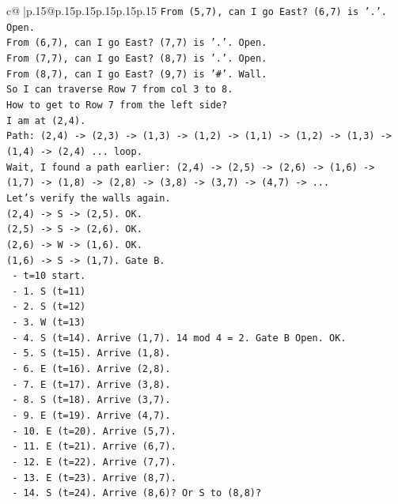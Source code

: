 \documentclass{article}
\begin{document}
{\begin{supertabular}{c@{$\;$}|p{.15\linewidth}@{}p{.15\linewidth}p{.15\linewidth}p{.15\linewidth}p{.15\linewidth}p{.15\linewidth}}
{{{\texttt{From (5,7), can I go East? (6,7) is '.'. Open.} \\
\texttt{From (6,7), can I go East? (7,7) is '.'. Open.} \\
\texttt{From (7,7), can I go East? (8,7) is '.'. Open.} \\
\texttt{From (8,7), can I go East? (9,7) is '\#'. Wall.} \\
\texttt{So I can traverse Row 7 from col 3 to 8.} \\
\texttt{How to get to Row 7 from the left side?} \\
\texttt{I am at (2,4).} \\
\texttt{Path: (2,4) {-}> (2,3) {-}> (1,3) {-}> (1,2) {-}> (1,1) {-}> (1,2) {-}> (1,3) {-}> (1,4) {-}> (2,4) ... loop.} \\
\texttt{Wait, I found a path earlier: (2,4) {-}> (2,5) {-}> (2,6) {-}> (1,6) {-}> (1,7) {-}> (1,8) {-}> (2,8) {-}> (3,8) {-}> (3,7) {-}> (4,7) {-}> ...} \\
\texttt{Let's verify the walls again.} \\
\texttt{(2,4) {-}> S {-}> (2,5). OK.} \\
\texttt{(2,5) {-}> S {-}> (2,6). OK.} \\
\texttt{(2,6) {-}> W {-}> (1,6). OK.} \\
\texttt{(1,6) {-}> S {-}> (1,7). Gate B.} \\
\texttt{   {-} t=10 start.} \\
\texttt{   {-} 1. S (t=11)} \\
\texttt{   {-} 2. S (t=12)} \\
\texttt{   {-} 3. W (t=13)} \\
\texttt{   {-} 4. S (t=14). Arrive (1,7). 14 mod 4 = 2. Gate B Open. OK.} \\
\texttt{   {-} 5. S (t=15). Arrive (1,8).} \\
\texttt{   {-} 6. E (t=16). Arrive (2,8).} \\
\texttt{   {-} 7. E (t=17). Arrive (3,8).} \\
\texttt{   {-} 8. S (t=18). Arrive (3,7).} \\
\texttt{   {-} 9. E (t=19). Arrive (4,7).} \\
\texttt{   {-} 10. E (t=20). Arrive (5,7).} \\
\texttt{   {-} 11. E (t=21). Arrive (6,7).} \\
\texttt{   {-} 12. E (t=22). Arrive (7,7).} \\
\texttt{   {-} 13. E (t=23). Arrive (8,7).} \\
\texttt{   {-} 14. S (t=24). Arrive (8,6)? Or S to (8,8)?} \\
}}}
\end{supertabular}}
\end{document}
